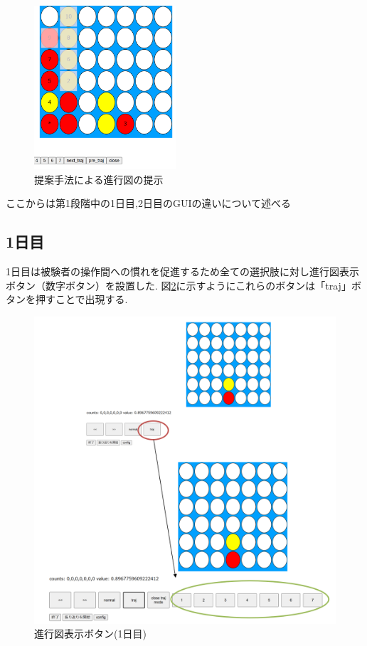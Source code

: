 \begin{figure}[t]
	\centering
	\includegraphics[width=150pt]{./figure/multi.png}
	\caption{提案手法による進行図の提示}
	\label{fig:multi}
\end{figure}
ここからは第1段階中の1日目,2日目のGUIの違いについて述べる
\subsection{1日目}
1日目は被験者の操作間への慣れを促進するため全ての選択肢に対し進行図表示ボタン（数字ボタン）を設置した.
図\ref{fig:traj-button}に示すようにこれらのボタンは「traj」ボタンを押すことで出現する.
\begin{figure}[t]
	\centering
	\includegraphics[width=\linewidth]{./figure/traj-button.png}
	\caption{進行図表示ボタン(1日目)}
	\label{fig:traj-button}
\end{figure}
